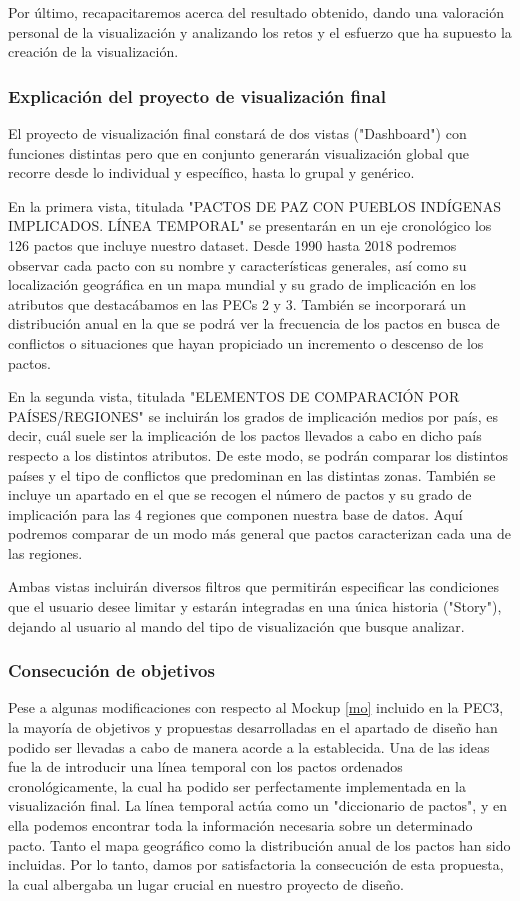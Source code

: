 \documentclass[11pt]{article}
\begin{document}
Por último, recapacitaremos acerca del resultado obtenido, dando una valoración personal de la visualización y analizando los retos y el esfuerzo que ha supuesto la creación de la visualización. 

\subsubsection{Explicación del proyecto de visualización final}

El proyecto de visualización final constará de dos vistas ("Dashboard") con funciones distintas pero que en conjunto generarán visualización global que recorre desde lo individual y específico, hasta lo grupal y genérico. 

En la primera vista, titulada "PACTOS DE PAZ CON PUEBLOS INDÍGENAS IMPLICADOS. LÍNEA TEMPORAL" se presentarán en un eje cronológico los 126 pactos que incluye nuestro dataset. Desde 1990 hasta 2018 podremos observar cada pacto con su nombre y características generales, así como su localización geográfica en un mapa mundial y su grado de implicación en los atributos que destacábamos en las PECs 2 y 3. También se incorporará un distribución anual en la que se podrá ver la frecuencia de los pactos en busca de conflictos o situaciones que hayan propiciado un incremento o descenso de los pactos.

En la segunda vista, titulada "ELEMENTOS DE COMPARACIÓN POR PAÍSES/REGIONES" se incluirán los grados de implicación medios por país, es decir, cuál suele ser la implicación de los pactos llevados a cabo en dicho país respecto a los distintos atributos. De este modo, se podrán comparar los distintos países y el tipo de conflictos que predominan en las distintas zonas. También se incluye un apartado en el que se recogen el número de pactos y su grado de implicación para las 4 regiones que componen nuestra base de datos. Aquí podremos comparar de un modo más general que pactos caracterizan cada una de las regiones.

Ambas vistas incluirán diversos filtros que permitirán especificar las condiciones que el usuario desee limitar y estarán integradas en una única historia ("Story"), dejando al usuario al mando del tipo de visualización que busque analizar.

\subsubsection{Consecución de objetivos}

Pese a algunas modificaciones con respecto al Mockup \ref{mo} incluido en la PEC3, la mayoría de objetivos y propuestas desarrolladas en el apartado de diseño han podido ser llevadas a cabo de manera acorde a la establecida. Una de las ideas fue la de introducir una línea temporal con los pactos ordenados cronológicamente, la cual ha podido ser perfectamente implementada en la visualización final. La línea temporal actúa como un "diccionario de pactos", y en ella podemos encontrar toda la información necesaria sobre un determinado pacto. Tanto el mapa geográfico como la distribución anual de los pactos han sido incluidas. Por lo tanto, damos por satisfactoria la consecución de esta propuesta, la cual albergaba un lugar crucial en nuestro proyecto de diseño.
\end{document}
